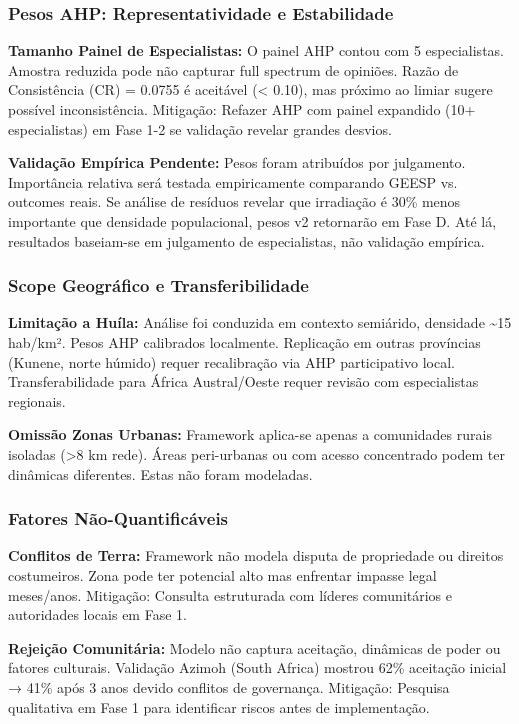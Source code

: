 \documentclass[12pt, a4paper]{article}
\begin{document}
\subsubsection{Pesos AHP: Representatividade e Estabilidade}

\textbf{Tamanho Painel de Especialistas:} O painel AHP contou com 5 especialistas. Amostra reduzida pode não capturar full spectrum de opiniões. Razão de Consistência (CR) = 0.0755 é aceitável (< 0.10), mas próximo ao limiar sugere possível inconsistência. Mitigação: Refazer AHP com painel expandido (10+ especialistas) em Fase 1-2 se validação revelar grandes desvios.

\textbf{Validação Empírica Pendente:} Pesos foram atribuídos por julgamento. Importância relativa será testada empiricamente comparando GEESP vs. outcomes reais. Se análise de resíduos revelar que irradiação é 30\% menos importante que densidade populacional, pesos v2 retornarão em Fase D. Até lá, resultados baseiam-se em julgamento de especialistas, não validação empírica.

\subsubsection{Scope Geográfico e Transferibilidade}

\textbf{Limitação a Huíla:} Análise foi conduzida em contexto semiárido, densidade \textasciitilde{}15 hab/km². Pesos AHP calibrados localmente. Replicação em outras províncias (Kunene, norte húmido) requer recalibração via AHP participativo local. Transferabilidade para África Austral/Oeste requer revisão com especialistas regionais.

\textbf{Omissão Zonas Urbanas:} Framework aplica-se apenas a comunidades rurais isoladas (>8 km rede). Áreas peri-urbanas ou com acesso concentrado podem ter dinâmicas diferentes. Estas não foram modeladas.

\subsubsection{Fatores Não-Quantificáveis}

\textbf{Conflitos de Terra:} Framework não modela disputa de propriedade ou direitos costumeiros. Zona pode ter potencial alto mas enfrentar impasse legal meses/anos. Mitigação: Consulta estruturada com líderes comunitários e autoridades locais em Fase 1.

\textbf{Rejeição Comunitária:} Modelo não captura aceitação, dinâmicas de poder ou fatores culturais. Validação Azimoh (South Africa) mostrou 62\% aceitação inicial → 41\% após 3 anos devido conflitos de governança. Mitigação: Pesquisa qualitativa em Fase 1 para identificar riscos antes de implementação.
\end{document}
